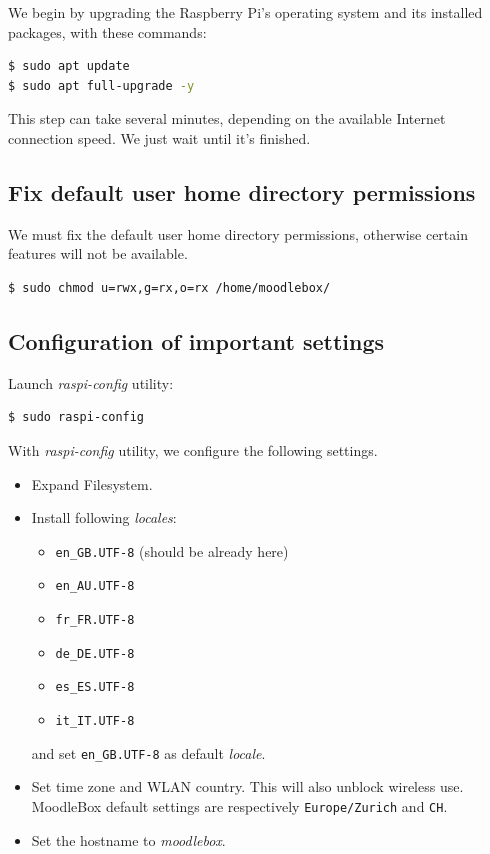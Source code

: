 \documentclass[12pt]{article}
\begin{document}
We begin by upgrading the Raspberry Pi's operating system and its installed packages, with these commands:
\begin{lstlisting}[language=bash]
$ sudo apt update
$ sudo apt full-upgrade -y
\end{lstlisting}

This step can take several minutes, depending on the available Internet connection speed.
We just wait until it's finished.

\subsection{Fix default user home directory permissions}

We must fix the default user home directory permissions, otherwise certain features will not be available.

\begin{lstlisting}[language=bash]
$ sudo chmod u=rwx,g=rx,o=rx /home/moodlebox/
\end{lstlisting}

\subsection{Configuration of important settings}

Launch \emph{raspi-config} utility:
\begin{lstlisting}[language=bash]
$ sudo raspi-config
\end{lstlisting}

With \emph{raspi-config} utility, we configure the following settings.
\begin{itemize}
\item Expand Filesystem.
\item Install following \emph{locales}:
\begin{itemize}
\item \lstinline{en_GB.UTF-8} (should be already here)
\item \lstinline{en_AU.UTF-8}
\item \lstinline{fr_FR.UTF-8}
\item \lstinline{de_DE.UTF-8}
\item \lstinline{es_ES.UTF-8}
\item \lstinline{it_IT.UTF-8}
\end{itemize}
and set \lstinline{en_GB.UTF-8} as default \emph{locale}.
\item Set time zone and WLAN country.
This will also unblock wireless use.
MoodleBox default settings are respectively \lstinline{Europe/Zurich} and \lstinline{CH}.
\item Set the hostname to \emph{moodlebox}.
\end{itemize}
\end{document}
